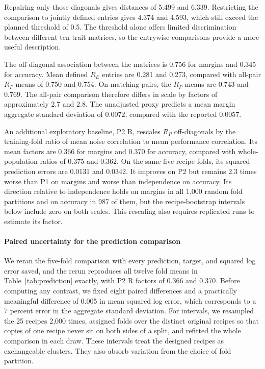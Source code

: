 Repairing only those diagonals gives distances of 5.499 and 6.339. Restricting the comparison to jointly defined entries gives 4.374 and 4.593, which still exceed the planned threshold of 0.5. The threshold alone offers limited discrimination between different ten-trait matrices, so the entrywise comparisons provide a more useful description.

The off-diagonal association between the matrices is 0.756 for margins and 0.345 for accuracy. Mean defined $R_E$ entries are 0.281 and 0.273, compared with all-pair $R_P$ means of 0.750 and 0.754. On matching pairs, the $R_P$ means are 0.743 and 0.769. The all-pair comparison therefore differs in scale by factors of approximately 2.7 and 2.8. The unadjusted proxy predicts a mean margin aggregate standard deviation of 0.0072, compared with the reported 0.0057.

An additional exploratory baseline, P2 R, rescales $R_P$ off-diagonals by the training-fold ratio of mean noise correlation to mean performance correlation. Its mean factors are 0.366 for margins and 0.370 for accuracy, compared with whole-population ratios of 0.375 and 0.362. On the same five recipe folds, its squared prediction errors are 0.0131 and 0.0342. It improves on P2 but remains 2.3 times worse than P1 on margins and worse than independence on accuracy. Its direction relative to independence holds on margins in all 1,000 random fold partitions and on accuracy in 987 of them, but the recipe-bootstrap intervals below include zero on both scales. This rescaling also requires replicated runs to estimate its factor.

\paragraph{Paired uncertainty for the prediction comparison}\label{app:paired}
We reran the five-fold comparison with every prediction, target, and squared log error saved, and the rerun reproduces all twelve fold means in Table~\ref{tab:prediction} exactly, with P2 R factors of 0.366 and 0.370. Before computing any contrast, we fixed eight paired differences and a practically meaningful difference of 0.005 in mean squared log error, which corresponds to a 7 percent error in the aggregate standard deviation. For intervals, we resampled the 25 recipes 2,000 times, assigned folds over the distinct original recipes so that copies of one recipe never sit on both sides of a split, and refitted the whole comparison in each draw. These intervals treat the designed recipes as exchangeable clusters. They also absorb variation from the choice of fold partition.

